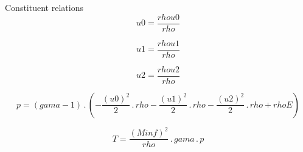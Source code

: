 \documentclass{article}
\begin{document}
\noindent Constituent relations
\\\begin{dmath}u0 = \frac{rhou0}{rho}\end{dmath}

\begin{dmath}u1 = \frac{rhou1}{rho}\end{dmath}

\begin{dmath}u2 = \frac{rhou2}{rho}\end{dmath}

\begin{dmath}p = \left(gama - 1\right) \,.\, \left(- \frac{\left(u0 \right)^{2}}{2} \,.\, rho - \frac{\left(u1 \right)^{2}}{2} \,.\, rho - \frac{\left(u2 \right)^{2}}{2} \,.\, rho + rhoE\right)\end{dmath}

\begin{dmath}T = \frac{\left(Minf \right)^{2}}{rho} \,.\, gama \,.\, p\end{dmath}
\end{document}
